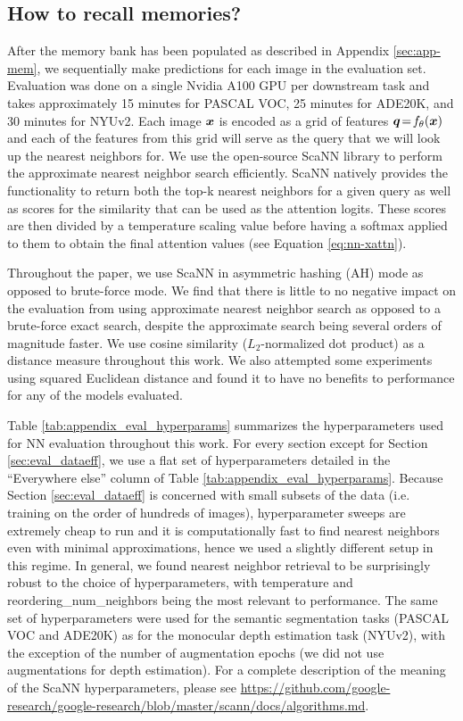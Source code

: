 \documentclass{article}
\begin{document}
\subsection{How to recall memories?}
\label{sec:app-ann}
After the memory bank has been populated as described in Appendix \ref{sec:app-mem}, we sequentially make predictions for each image in the evaluation set. Evaluation was done on a single Nvidia A100 GPU per downstream task and takes approximately 15 minutes for PASCAL VOC, 25 minutes for ADE20K, and 30 minutes for NYUv2. Each image ${\bm{x}}$ is encoded as a grid of features ${\bm{q}} \!=\! f_\theta({\bm{x}})$ and each of the features from this grid will serve as the query that we will look up the nearest neighbors for. We use the open-source ScaNN library \cite{guo2020accelerating} to perform the approximate nearest neighbor search efficiently. ScaNN natively provides the functionality to return both the top-k nearest neighbors for a given query as well as scores for the similarity that can be used as the attention logits. These scores are then divided by a temperature scaling value before having a softmax applied to them to obtain the final attention values (see Equation \ref{eq:nn-xattn}).

Throughout the paper, we use ScaNN in asymmetric hashing (AH) mode as opposed to brute-force mode. We find that there is little to no negative impact on the evaluation from using approximate nearest neighbor search as opposed to a brute-force exact search, despite the approximate search being several orders of magnitude faster. We use cosine similarity ($L_2$-normalized dot product) as a distance measure throughout this work. We also attempted some experiments using squared Euclidean distance and found it to have no benefits to performance for any of the models evaluated.



Table \ref{tab:appendix_eval_hyperparams} summarizes the hyperparameters used for NN evaluation throughout this work. For every section except for Section \ref{sec:eval_dataeff}, we use a flat set of hyperparameters detailed in the ``Everywhere else'' column of Table \ref{tab:appendix_eval_hyperparams}. Because Section \ref{sec:eval_dataeff} is concerned with small subsets of the data (i.e. training on the order of hundreds of images), hyperparameter sweeps are extremely cheap to run and it is computationally fast to find nearest neighbors even with minimal approximations, hence we used a slightly different setup in this regime. In general, we found nearest neighbor retrieval to be surprisingly robust to the choice of hyperparameters, with temperature and reordering\_num\_neighbors being the most relevant to performance. The same set of hyperparameters were used for the semantic segmentation tasks (PASCAL VOC and ADE20K) as for the monocular depth estimation task (NYUv2), with the exception of the number of augmentation epochs (we did not use augmentations for depth estimation). For a complete description of the meaning of the ScaNN hyperparameters, please see \url{https://github.com/google-research/google-research/blob/master/scann/docs/algorithms.md}.
\end{document}
